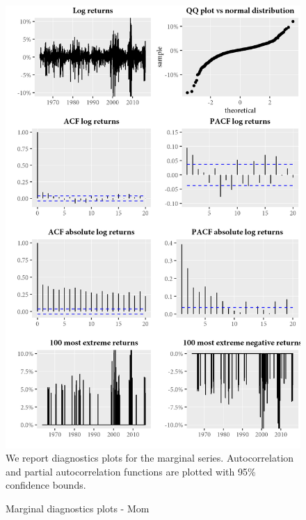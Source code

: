\begin{figure}[H]
  \caption{Marginal diagnostics plots - Mom}
  \label{diag:marginaldiagMom}
  \centering
  \begin{minipage}{\textwidth}
  \includegraphics[scale=1]{graphics/marginal/MarginalStats.Mom.Estim.png}  
  \vspace{3mm}
  \footnotesize
  We report diagnostics plots for the marginal series. Autocorrelation and partial autocorrelation functions are plotted with 95\% confidence bounds. 
  \end{minipage}
\end{figure}
